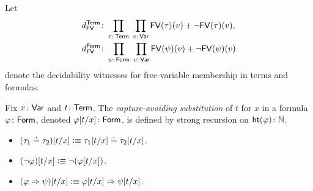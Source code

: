 \begin{defn}[Substitution]\label{defn:substitution}
    Let
    \begin{align*}
        d_{\fun{FV}}^{\fun{Term}}&\colon
            \prod_{\tau\colon\fun{Term}}\;
            \prod_{v\colon\fun{Var}}
                \fun{FV}(\tau)(v)+\neg\fun{FV}(\tau)(v),\\
        d_{\fun{FV}}^{\fun{Form}}&\colon
            \prod_{\psi\colon\fun{Form}}\;
            \prod_{v\colon\fun{Var}}
                \fun{FV}(\psi)(v)+\neg\fun{FV}(\psi)(v)
    \end{align*}
    denote the decidability witnesses for free-variable membership in terms and formulas.
    
    Fix $x\colon\fun{Var}$ and $t\colon\fun{Term}$. The \textsl{capture-avoiding substitution} of $t$ for $x$ in a formula $\varphi\colon\fun{Form}$, denoted $\varphi[t/x]\colon\fun{Form}$, is defined by strong recursion on $\fun{ht}(\varphi)\colon\N$.
    \begin{itemize}
        \item $(\tau_1\doteq\tau_2)[t/x]\mathrel{\vcentcolon}\equiv\tau_1[t/x]\doteq\tau_2[t/x]$.
        
        \item $(\neg\varphi)[t/x]\mathrel{\vcentcolon}\equiv\neg(\varphi[t/x])$.
        
        \item $(\varphi\mathrel{\Rightarrow}\psi)[t/x]\mathrel{\vcentcolon}\equiv\varphi[t/x]\mathrel{\Rightarrow}\psi[t/x]$.
        

\end{itemize}
\end{defn}
